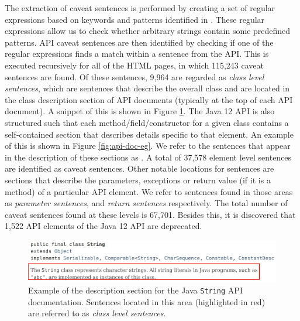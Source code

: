 The extraction of caveat sentences is performed by creating a set of regular expressions based on keywords and patterns identified in \cite{caveat-knowledge-graph}. These regular expressions allow us to check whether arbitrary strings contain some predefined patterns. API caveat sentences are then identified by checking if one of the regular expressions finds a match within a sentence from the API. This is executed recursively for all of the HTML pages, in which 115,243 caveat sentences are found. Of these sentences, 9,964 are regarded as \textit{class level sentences}, which are sentences that describe the overall class and are located in the class description section of API documents (typically at the top of each API document). A snippet of this is shown in Figure \ref{fig:class-sents}. The Java 12 API is also structured such that each method/field/constructor for a given class contains a self-contained section that describes details specific to that element. An example of this is shown in Figure \ref{fig:api-doc-eg}. We refer to the sentences that appear in the description of these sections as . A total of 37,578 element level sentences are identified as caveat sentences. Other notable locations for sentences are sections that describe the parameters, exceptions or return value (if it is a method) of a particular API element. We refer to sentences found in those areas as \textit{parameter sentences},  and \textit{return sentences} respectively. The total number of caveat sentences found at these levels is 67,701. Besides this, it is discovered that 1,522 API elements of the Java 12 API are deprecated. \\

\begin{figure}[h]
	\label{fig:class-sents}
	\centering
	\includegraphics[width=\textwidth]{figs/class-sents-highlight.png}
	\caption{Example of the description section for the Java \lstinline{String} API documentation. Sentences located in this area (highlighted in red) are referred to as \textit{class level sentences}.}
\end{figure}

